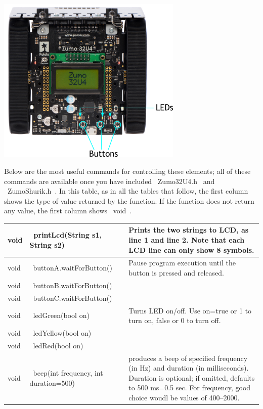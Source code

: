 \documentclass[oneside]{stml-l}
\numberwithin{figure}{chapter}
\begin{document}
\includegraphics[height=8cm]{figures/buttons.png}

Below are the most useful commands for controlling these elements; 
all of these commands are available once you have included ~Zumo32U4.h~ and 
~ZumoShurik.h~. In this table, as in all the tables that follow, the first column
shows the type of value returned by the function. If the function does not 
return any value, the first column shows ~void~.

\begin{tabular}{|l | l | p{7cm}|}
\hline 
void & ~printLcd(String s1, String s2)~ & Prints the two strings to LCD, 
        as line 1 and line 2. Note that each LCD line can only show 8 symbols.\\ 
\hline
void & ~buttonA.waitForButton()~ & Pause program execution 
                      until the button  is pressed and released.\\ 
\cline{1-2}
void & ~buttonB.waitForButton()~& \\
\cline{1-2}
void & ~buttonC.waitForButton()~& \\
\hline
void & ~ledGreen(bool on)~ & Turns LED on/off. Use on=true or 1 to turn on, 
                              false or 0 to turn off.\\ 
\cline{1-2}
void & ~ledYellow(bool on)~& \\
\cline{1-2}
void & ~ledRed(bool on)~& \\
\hline
void & ~beep(int frequency, int duration=500)~& produces a beep of specified 
frequency (in Hz) and duration (in milliseconds). Duration is optional; if omitted, 
defaults to 500 ms=0.5 sec. For frequency, good choice woudl be values of 400--2000.
\\
\hline
\end{tabular}
\end{document}
